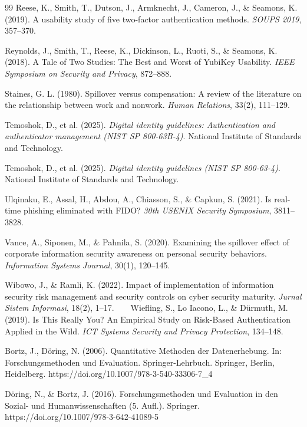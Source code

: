 \begin{thebibliography}{99}
Reese, K., Smith, T., Dutson, J., Armknecht, J., Cameron, J., \& Seamons, K. (2019). A usability study of five two-factor authentication methods. \textit{SOUPS 2019}, 357--370.

Reynolds, J., Smith, T., Reese, K., Dickinson, L., Ruoti, S., \& Seamons, K. (2018). A Tale of Two Studies: The Best and Worst of YubiKey Usability. \textit{IEEE Symposium on Security and Privacy}, 872--888.

Staines, G. L. (1980). Spillover versus compensation: A review of the literature on the relationship between work and nonwork. \textit{Human Relations}, 33(2), 111--129.

Temoshok, D., et al. (2025). \textit{Digital identity guidelines: Authentication and authenticator management (NIST SP 800-63B-4)}. National Institute of Standards and Technology.

Temoshok, D., et al. (2025). \textit{Digital identity guidelines (NIST SP 800-63-4)}. National Institute of Standards and Technology.

Ulqinaku, E., Assal, H., Abdou, A., Chiasson, S., \& Capkun, S. (2021). Is real-time phishing eliminated with FIDO? \textit{30th USENIX Security Symposium}, 3811--3828.

Vance, A., Siponen, M., \& Pahnila, S. (2020). Examining the spillover effect of corporate information security awareness on personal security behaviors. \textit{Information Systems Journal}, 30(1), 120--145.

Wibowo, J., \& Ramli, K. (2022). Impact of implementation of information security risk management and security controls on cyber security maturity. \textit{Jurnal Sistem Informasi}, 18(2), 1--17.
    
Wiefling, S., Lo Iacono, L., \& Dürmuth, M. (2019). Is This Really You? An Empirical Study on Risk-Based Authentication Applied in the Wild. \textit{ICT Systems Security and Privacy Protection}, 134--148.

Bortz, J., Döring, N. (2006). Quantitative Methoden der Datenerhebung. In: Forschungsmethoden und Evaluation. Springer-Lehrbuch. Springer, Berlin, Heidelberg. https://doi.org/10.1007/978-3-540-33306-7_4

Döring, N., & Bortz, J. (2016). Forschungsmethoden und Evaluation in den Sozial- und Humanwissenschaften (5. Aufl.). Springer. https://doi.org/10.1007/978-3-642-41089-5





\end{thebibliography}


